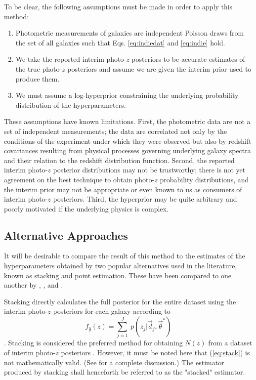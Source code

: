 \documentclass[preprint]{aastex}
\begin{document}
To be clear, the following assumptions must be made in order to apply this 
method:

\begin{enumerate}
\item Photometric measurements of galaxies are independent Poisson draws from 
the set of all galaxies such that Eqs. \ref{eq:indiedat} and \ref{eq:indie} 
hold.
\item We take the reported interim photo-$z$ posteriors to be accurate 
estimates of the true photo-$z$ posteriors and assume we are given the interim 
prior used to produce them.
\item We must assume a log-hyperprior constraining the underlying probability 
distribution of the hyperparameters.
\end{enumerate}

These assumptions have known limitations.  First, the photometric data are not 
a set of independent measurements; the data are correlated not only by the 
conditions of the experiment under which they were observed but also by 
redshift covariances resulting from physical processes governing underlying 
galaxy spectra and their relation to the redshift distribution function.  
Second, the reported interim photo-$z$ posterior distributions may not be 
trustworthy; there is not yet agreement on the best technique to obtain 
photo-$z$ probability distributions, and the interim prior may not be 
appropriate or even known to us as consumers of interim photo-$z$ posteriors.  
Third, the hyperprior may be quite arbitrary and poorly motivated if the 
underlying physics is complex.

\subsection{Alternative Approaches}
\label{sec:sheldon}

It will be desirable to compare the result of this method to the estimates of 
the hyperparameters obtained by two popular alternatives used in the 
literature, known as stacking and point estimation.   These have been compared 
to one another by \citet{Hildebrandt2012}, \citet{Benjamin2013}, and 
\citet{Asorey2016}.

Stacking directly calculates the full posterior for the entire dataset using 
the interim photo-$z$ posteriors for each galaxy according to 
\begin{equation}
\label{eq:stack}
f_{\hat{\theta}}(z) = \sum_{j=1}^{J}\ p(z_{j}|\vec{d}_{j},\vec{\theta}^{*})
\end{equation}
\citep{Lima2008}.  Stacking is considered the preferred method for obtaining 
$N(z)$ from a dataset of interim photo-$z$ posteriors \citep{Sheldon2012, 
Kelly2014, Benjamin2013, Bonnett2015a, Viironen2015, Asorey2016}.  However, it 
must be noted here that (\ref{eq:stack}) is not mathematically valid.  (See 
\citet{Hogg2012} for a complete discussion.)  The estimator produced by 
stacking shall henceforth be referred to as the "stacked" estimator.
\end{document}
